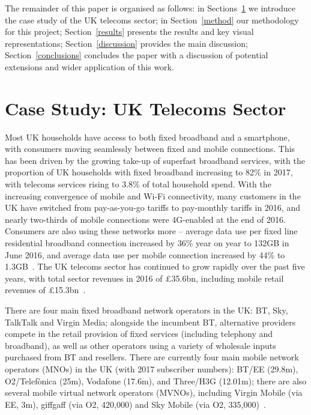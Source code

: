 \documentclass[sigconf]{acmart}
\begin{document}
The remainder of this paper is organised as follows: in
Sections~\ref{casestudy} we introduce the case study of the UK
telecoms sector; in Section~\ref{method} our methodology for this
project; Section~\ref{results} presents the results and key visual
representations; Section~\ref{discussion} provides the main
discussion; Section~\ref{conclusions} concludes the paper with a
discussion of potential extensions and wider application of this work.

\section{Case Study: UK Telecoms Sector}\label{casestudy}

Most UK households have access to both fixed broadband and a
smartphone, with consumers moving seamlessly between fixed and mobile
connections. This has been driven by the growing take-up of superfast
broadband services, with the proportion of UK households with fixed
broadband increasing to 82\% in 2017, with telecoms services rising to
3.8\% of total household spend. With the increasing convergence of
mobile and Wi-Fi connectivity, many customers in the UK have switched
from pay-as-you-go tariffs to pay-monthly tariffs in 2016, and nearly
two-thirds of mobile connections were 4G-enabled at the end of
2016. Consumers are also using these networks more -- average data use
per fixed line residential broadband connection increased by 36\% year
on year to 132GB in June 2016, and average data use per mobile
connection increased by 44\% to 1.3GB~\cite{ofcom:2017}. The UK
telecoms sector has continued to grow rapidly over the past five
years, with total sector revenues in 2016 of \pounds35.6bn, including
mobile retail revenues of \pounds15.3bn~\cite{ofcom:2017}.

There are four main fixed broadband network operators in the UK: BT,
Sky, TalkTalk and Virgin Media; alongside the incumbent BT,
alternative providers compete in the retail provision of fixed
services (including telephony and broadband), as well as other
operators using a variety of wholesale inputs purchased from BT and
resellers. There are currently four main mobile network operators
(MNOs) in the UK (with 2017 subscriber numbers): BT/EE (29.8m),
O2/Telef\`{o}nica (25m), Vodafone (17.6m), and Three/H3G (12.01m);
there are also several mobile virtual network operators (MVNOs),
including Virgin Mobile (via EE, 3m), giffgaff (via O2, 420,000) and
Sky Mobile (via O2, 335,000)~\cite{ecdpr:2017}.
\end{document}
